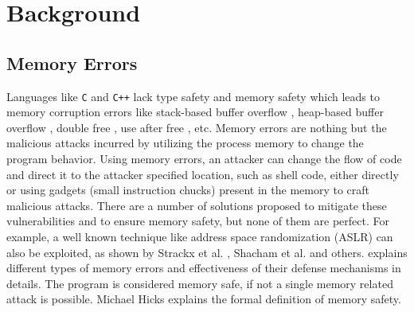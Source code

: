 
\chapter{Background}

\section{Memory Errors}
Languages like \texttt{C} and \texttt{C++} lack type safety and memory safety which leads to memory corruption errors like stack-based buffer overflow \citep{cwe121}, heap-based buffer overflow \citep{cwe122}, double free \citep{cwe415}, use after free \citep{cwe416}, etc. Memory errors are nothing but the malicious attacks incurred by utilizing the process memory to change the program behavior. Using memory errors, an attacker can change the flow of code and direct it to the attacker specified location, such as shell code, either directly or using gadgets (small instruction chucks) present in the memory to craft malicious attacks. There are a number of solutions proposed to mitigate these vulnerabilities and to ensure memory safety, but none of them are perfect. For example, a well known technique like address space randomization (ASLR) \citep{aslr} can also be exploited, as shown by Strackx et al. \citep{strackx2009breaking}, Shacham et al. \citep{Shacham:2004:EAR:1030083.1030124} and others. \citep{6547101} explains different types of memory errors and effectiveness of their defense mechanisms in details. The program is considered memory safe, if not a single memory related attack is possible. Michael Hicks \citep{memsafetydef} explains the formal definition of memory safety.

